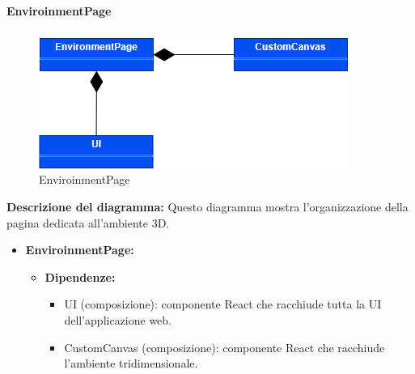 \paragraph{EnviroinmentPage}
\begin{figure}[h!] \centering
    \includegraphics[scale=0.45]{template/images/uml_front/ui/envpage.png}
    \caption{EnviroinmentPage}
\end{figure}
\textbf{Descrizione del diagramma:}
Questo diagramma mostra l'organizzazione della pagina dedicata all'ambiente 3D.
\begin{itemize}
    \item \textbf{EnviroinmentPage:}
    \begin{itemize}
        \item \textbf{Dipendenze:}
        \begin{itemize}
            \item UI (composizione): componente React che racchiude tutta la UI dell'applicazione web.
            \item CustomCanvas (composizione): componente React che racchiude l'ambiente tridimensionale.
        \end{itemize} 
    \end{itemize}
\end{itemize}

